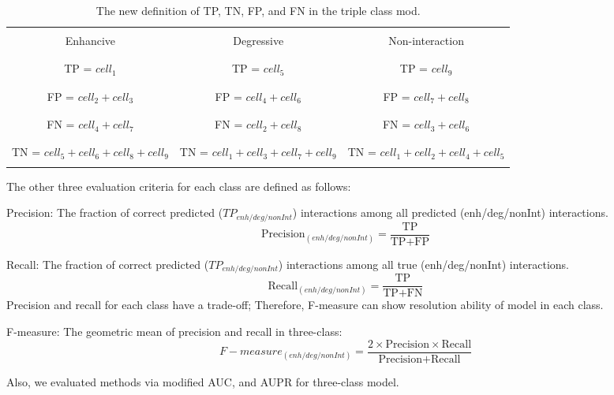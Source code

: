 \documentclass{bmcart}
\begin{document}
\begin{table}[h!]
	\centering
	\begin{tabular}{|c|c|c|}
		\cline{1-3}
		&&\\
		Enhancive & Degressive & Non-interaction\\
		&&\\
		\cline{1-3}
		&&\\
		TP = $cell_1$ & TP = $cell_5$ & TP = $cell_9$\\
		&&\\
		\cline{1-3}
		&&\\
		FP = $cell_2 + cell_3$ & FP = $cell_4 + cell_6$ & FP = $cell_7 + cell_8$\\
		&&\\
		\cline{1-3}
		&&\\
		FN = $cell_4 + cell_7$ & FN = $cell_2 + cell_8$ & FN = $cell_3 + cell_6$\\
		&&\\
		\cline{1-3}
		&&\\
		TN = $cell_5 + cell_6 + cell_8 + cell_9$ & TN = $cell_1 + cell_3 + cell_7 + cell_9$ & TN = $cell_1 + cell_2 + cell_4 + cell_5$\\
		&&\\
		\cline{1-3}
	\end{tabular}
	\newline
	\caption{The new definition of TP, TN, FP, and FN in the triple class mod.}
	\label{TPFPFNTN}
\end{table}



The other three evaluation criteria for each class are defined as follows:

Precision: The fraction of correct predicted ($TP_{enh/deg/nonInt}$) interactions among all predicted (enh/deg/nonInt) interactions.
$$ \mbox{Precision}_{(enh/deg/nonInt)} =  \frac{\mbox{TP}}{\mbox{TP} + \mbox{FP}} $$

Recall: The fraction of correct predicted ($TP_{enh/deg/nonInt}$) interactions among all true (enh/deg/nonInt) interactions.
$$ \mbox{Recall}_{(enh/deg/nonInt)} =  \frac{ \mbox{TP}}{\mbox{TP} + \mbox{FN}} $$
Precision and recall for each class have a trade-off; Therefore, F-measure can show resolution ability of model in each class.

F-measure: The geometric mean of precision and recall in three-class:
$$ F-measure_{(enh/deg/nonInt)} = \frac{ 2\times \mbox{Precision} \times \mbox{Recall}}{\mbox{Precision} + \mbox{Recall}} $$

Also, we evaluated methods via modified AUC, and AUPR for three-class model.
\end{document}
